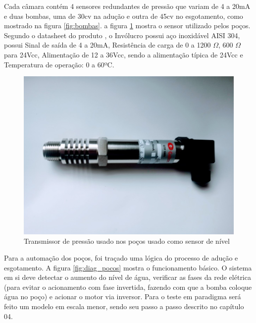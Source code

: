Cada câmara contém 4 sensores redundantes de pressão que variam de 4 a 20mA e duas bombas, uma de 30cv na adução e outra de 45cv no esgotamento, como mostrado na figura \ref{fig:bombas}. a figura \ref{fig:sensor} mostra o sensor utilizado pelos poços. Segundo o datasheet do produto \cite{Gulton}, o Invólucro possui aço inoxidável AISI 304, possui Sinal de saída de 4 a 20mA, Resistência de carga de 0 a 1200 $\Omega$, 600 $\Omega$ para 24Vcc,  Alimentação de 12 a 36Vcc, sendo a alimentação típica de 24Vcc e Temperatura de operação: 0 a 60ºC.

\begin{figure}[h]
	\centering
	\label{fig:sensor}
		\includegraphics[keepaspectratio=true,scale=0.6]{figuras/GTP1000HT.jpg}
	\caption{Transmissor de pressão usado nos poços usado como sensor de nível}
\end{figure}

Para a automação dos poços, foi traçado uma lógica do processo de adução e esgotamento. A figura \ref{fig:diag_pocos} mostra o funcionamento básico. O sistema em si deve detectar o aumento do nível de água, verificar as fases da rede elétrica (para evitar o acionamento com fase invertida, fazendo com que a bomba coloque água no poço) e acionar o motor via inversor. Para o teste em paradigma será feito um modelo em escala menor, sendo seu passo a passo descrito no capítulo 04. 


